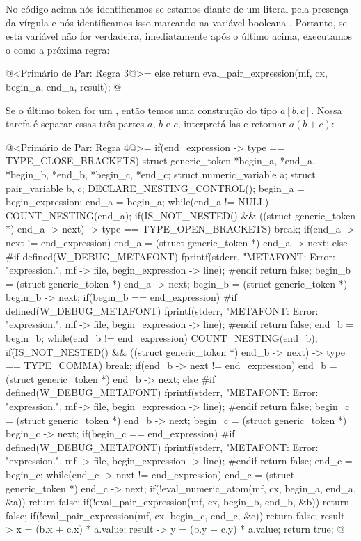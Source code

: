 No código acima nós identificamos se estamos diante de um literal pela
presença da vírgula e nós identificamos isso marcando na variável
booleana . Portanto, se esta variável não for
verdadeira, imediatamente após o último  acima,
executamos o  como a próxima regra:

\iniciocodigo
@<Primário de Par: Regra 3@>=
else{
  return eval_pair_expression(mf, cx, begin_a, end_a, result);
}
@
\fimcodigo

Se o último token for um \monoespaco{]}, então temos uma construção do
tipo $a[b,c]$. Nossa tarefa é separar essas três partes $a$, $b$ e
$c$, interpretá-las e retornar $a(b+c)$:

\iniciocodigo
@<Primário de Par: Regra 4@>=
if(end_expression -> type == TYPE_CLOSE_BRACKETS){
  struct generic_token *begin_a, *end_a, *begin_b, *end_b, *begin_c,
                       *end_c;
  struct numeric_variable a;
  struct pair_variable b, c;
  DECLARE_NESTING_CONTROL();
  begin_a = begin_expression;
  end_a = begin_a;
  while(end_a != NULL){
    COUNT_NESTING(end_a);
    if(IS_NOT_NESTED() &&
       ((struct generic_token *) end_a -> next) -> type ==
        TYPE_OPEN_BRACKETS)
      break;
    if(end_a -> next != end_expression)
      end_a = (struct generic_token *) end_a -> next;
    else{
#if defined(W_DEBUG_METAFONT)
      fprintf(stderr, "METAFONT: Error: %
              "expression.\n ", mf -> file, begin_expression -> line);
#endif
      return false;
    }
  }
  begin_b = (struct generic_token *) end_a -> next;
  begin_b = (struct generic_token *) begin_b -> next;
  if(begin_b == end_expression){
#if defined(W_DEBUG_METAFONT)
    fprintf(stderr, "METAFONT: Error: %
            "expression.\n ", mf -> file, begin_expression -> line);
#endif
    return false;
  }
  end_b = begin_b;
  while(end_b != end_expression){
    COUNT_NESTING(end_b);
    if(IS_NOT_NESTED() &&
       ((struct generic_token *) end_b -> next) -> type == TYPE_COMMA)
      break;
    if(end_b -> next != end_expression)
      end_b = (struct generic_token *) end_b -> next;
    else{
#if defined(W_DEBUG_METAFONT)
      fprintf(stderr, "METAFONT: Error: %
              "expression.\n ", mf -> file, begin_expression -> line);
#endif
      return false;
    }
  }
  begin_c = (struct generic_token *) end_b -> next;
  begin_c = (struct generic_token *) begin_c -> next;
  if(begin_c == end_expression){
#if defined(W_DEBUG_METAFONT)
    fprintf(stderr, "METAFONT: Error: %
            "expression.\n ", mf -> file, begin_expression -> line);
#endif
    return false;
  }
  end_c = begin_c;
  while(end_c -> next != end_expression)
    end_c = (struct generic_token *) end_c -> next;
  if(!eval_numeric_atom(mf, cx, begin_a, end_a, &a))
    return false;
  if(!eval_pair_expression(mf, cx, begin_b, end_b, &b))
    return false;
  if(!eval_pair_expression(mf, cx, begin_c, end_c, &c))
    return false;
  result -> x = (b.x + c.x) * a.value;
  result -> y = (b.y + c.y) * a.value;
  return true;
}
@
\fimcodigo

